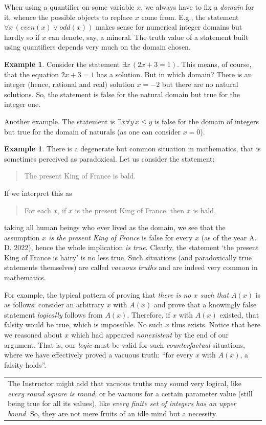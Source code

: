 \documentclass[12pt,notitlepage]{article}
\theoremstyle{plain}
\theoremstyle{definition}
\newtheorem{exm}[thm]{Example}
\theoremstyle{plain}
\newcommand{\1}{\mathbf{1}}
\newcommand{\0}{\mathbf{0}}
\newcommand{\mcomm}[1]{
\medskip\noindent\begin{tabular}{| l}
\parbox{0.99\textwidth}{{\small
#1 }}\end{tabular}
\smallskip}
\begin{document}
When using a quantifier on some variable $x$, we always have to fix a \emph{domain} for it, whence the possible objects to replace $x$ come from. E.g., the statement $\forall x\, ( even(x) \vee odd(x))$ makes sense for numerical integer domains but hardly so if $x$ can denote, say, a mineral. The truth value of a statement built using quantifiers depends very much on the domain chosen.

\begin{exm}
Consider the statement $\exists x\, (2 x + 3 = 1)$. This means, of course, that the equation $2x + 3 = 1$ has a solution. But in which domain? There is an integer (hence, rational and real) solution $x = -2$ but there are no natural solutions. So, the statement is false for the natural domain but true for the integer one.

Another example. The statement is $\exists x \forall y\, x \leq y$ is false for the domain of integers but true for the domain of naturals (as one can consider $x = 0$).
\end{exm}

\begin{exm}\label{exm_vacuous}
There is a degenerate but common situation in mathematics, that is sometimes perceived as paradoxical. Let us consider the statement:
\begin{quote}
The present King of France is bald.
\end{quote}
If we interpret this as 
\begin{quote}
For each $x$, if $x$ is the present King of France, then $x$ is bald,
\end{quote}
taking all human beings who ever lived as the domain, we see that the assumption \emph{$x$ is the present King of France} is false for every $x$ (as of the year A.\,D. $2022$), hence the whole implication \emph{is true}. Clearly, the statement `the present King of France is hairy' is no less true. Such situations (and paradoxically true statements themselves) are called \emph{vacuous truths}  and are indeed very common in mathematics.

For example, the typical pattern of proving that \emph{there is no $x$ such that $A(x)$} is as follows: consider an arbitrary $x$ with $A(x)$ and prove that a knowingly false statement \emph{logically} follows from $A(x)$. Therefore, if $x$ with $A(x)$ existed, that falsity would be true, which is impossible. No such $x$ thus exists. Notice that here we reasoned about $x$ which had appeared \emph{nonexistent} by the end of our argument. That is, our \emph{logic} must be valid for such \emph{counterfactual} situations, where we have effectively proved a vacuous truth: ``for every $x$ with $A(x)$, a falsity holds''. 
\end{exm}
\mcomm{The Instructor might add that vacuous truths may sound very logical, like \emph{every round square is round}, or be vacuous for a certain parameter value (still being true for all its values), like \emph{every finite set of integers has an upper bound}. So, they are not mere fruits of an idle mind but a necessity.}
\end{document}
